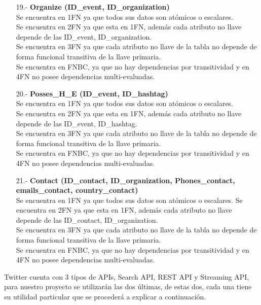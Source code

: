 \documentclass{memoria}
\begin{document}
\begin{itemize}
\item[19.-]\textbf{Organize (ID\_event, ID\_organization)}
\\
Se encuentra en 1FN ya que todos sus datos son atómicos o escalares.\\
Se encuentra en 2FN ya que esta en 1FN, además cada atributo no llave depende de las ID\_event, ID\_organization. \\Se encuentra en 3FN ya que cada atributo no llave de la tabla no depende de forma funcional transitiva de la llave primaria.\\ Se encuentra en FNBC,  ya que no hay dependencias por transitividad y en  4FN no posee dependencias multi-evaluadas.\\

\item[20.-]\textbf{Posses\_H\_E (ID\_event, ID\_hashtag)}
\\
Se encuentra en 1FN ya que todos sus datos son atómicos o escalares.\\
Se encuentra en 2FN ya que esta en 1FN, además cada atributo no llave depende de las ID\_event, ID\_hashtag.\\ Se encuentra en 3FN ya que cada atributo no llave de la tabla no depende de forma funcional transitiva de la llave primaria. \\Se encuentra en FNBC,  ya que no hay dependencias por transitividad y en  4FN no posee dependencias multi-evaluadas.

\item[21.-]\textbf{Contact (ID\_contact, ID\_organization, Phones\_contact, emails\_contact, country\_contact)}
\\
Se encuentra en 1FN ya que todos sus datos son atómicos o escalares.
Se encuentra en 2FN ya que esta en 1FN, además cada atributo no llave depende de las ID\_contact, ID\_organization.\\ Se encuentra en 3FN ya que cada atributo no llave de la tabla no depende de forma funcional transitiva de la llave primaria.\\ Se encuentra en FNBC,  ya que no hay dependencias por transitividad y en  4FN no posee dependencias multi-evaluadas.
\end{itemize}

Twitter cuenta con 3 tipos de APIs, Search API, REST API y Streaming API, para nuestro proyecto se utilizarán las dos últimas, de estas dos, cada una tiene su utilidad particular que se procederá a explicar a continuación.\\
\end{document}
